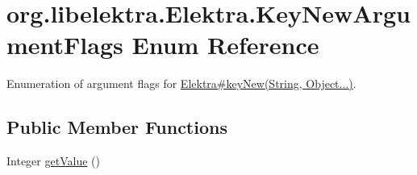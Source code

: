 \hypertarget{enumorg_1_1libelektra_1_1Elektra_1_1KeyNewArgumentFlags}{}\section{org.\+libelektra.\+Elektra.\+Key\+New\+Argument\+Flags Enum Reference}
\label{enumorg_1_1libelektra_1_1Elektra_1_1KeyNewArgumentFlags}


Enumeration of argument flags for \hyperlink{}{Elektra\#key\+New(\+String, Object...)}.  


\subsection*{Public Member Functions}
\begin{DoxyCompactItemize}
\item 
Integer \hyperlink{enumorg_1_1libelektra_1_1Elektra_1_1KeyNewArgumentFlags_a0af26490c60862970ad8cbb6ccbe00bb}{get\+Value} ()
\end{DoxyCompactItemize}
